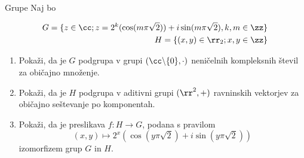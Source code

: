 \begin{frame}{Grupe}
	Naj bo
	
	\begin{align*}
		G = \{z\in \cc ; z = 2^k(\cos(m\pi \sqrt{2})) + i\sin (m\pi \sqrt{2}),k,m \in \zz \} \\
		H = \{(x,y) \in \rr _2; x,y \in \zz \}
	\end{align*}
	\begin{enumerate}
		\item
			Pokaži, da je $G$ podgrupa v grupi $(\cc \backslash \{0\},\cdot)$
			neničelnih kompleksnih števil za običajno množenje.
		\item
			Pokaži, da je $H$ podgrupa v aditivni grupi $(\rr ^2,+)$
			ravninskih vektorjev za običajno seštevanje po komponentah.
		\item
			Pokaži, da je preslikava $f:H\to G$, podana s pravilom
			$$
			(x,y)\mapsto 2^x(\cos (y\pi \sqrt{2}) + i\sin (y\pi \sqrt{2}))
			$$
			izomorfizem grup $G$ in $H$.
	\end{enumerate}
\end{frame}

